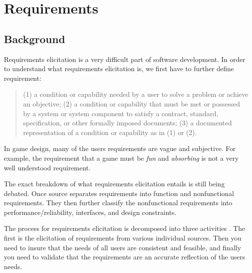 \section{Requirements}
\subsection{Background}
Requirements elicitation is a very difficult part of software development. In order to understand what requirements elicitation is, we first have to further define requirement:
\begin{quote}
	(1) a condition or capability needed by a user to solve a problem or achieve an objective; (2) a condition or capability that must be met or possessed by a system or system component to satisfy a contract, standard, specification, or other formally imposed documents; (3) a documented representation of a condition or capability as in (1) or (2)\cite{september1990ieee}.
\end{quote}
In game design, many of the users requirements are vague and subjective. For example, the requirement that a game must be \emph{fun} and \emph{absorbing} is not a very well understood requirement. 

The exact breakdown of what requirements elicitation entails is still being debated. Once source separates requirements into function and nonfunctional requirements\cite{southwell1987requirements}. They then further classify the nonfunctional requirements into performance/reliability, interfaces, and design constraints.

The process for requirements elicitation is decomposed into three activities \cite{rzepka1989requirements}. The first is the elicitation of requirements from various individual sources. Then you need to insure that the needs of all users are consistent and feasible, and finally you need to validate that the requirements are an accurate reflection of the users needs.

